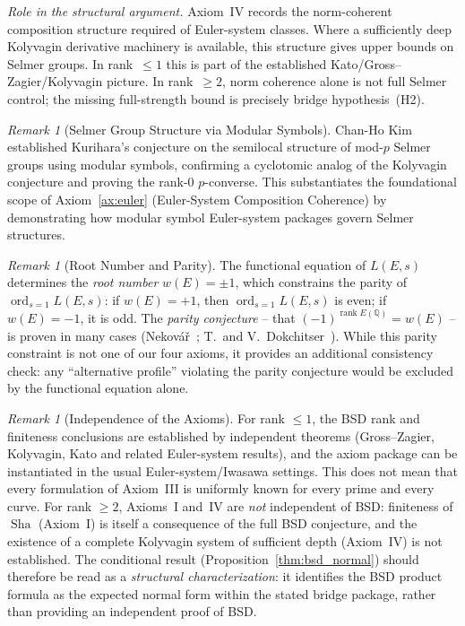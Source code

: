 \documentclass[aps,prd,twocolumn,superscriptaddress,nofootinbib,floatfix]{revtex4-2}
\theoremstyle{definition}
\theoremstyle{remark}
\newtheorem{remark}[theorem]{Remark}
\DeclareMathOperator{\ord}{ord}
\DeclareMathOperator{\rank}{rank}
\DeclareMathOperator{\Sha}{Sha}
\begin{document}
\textit{Role in the structural argument.} Axiom~IV records the norm-coherent composition structure required of Euler-system classes. Where a sufficiently deep Kolyvagin derivative machinery is available, this structure gives upper bounds on Selmer groups. In rank~$\leq 1$ this is part of the established Kato/Gross--Zagier/Kolyvagin picture. In rank~$\geq 2$, norm coherence alone is not full Selmer control; the missing full-strength bound is precisely bridge hypothesis~(H2).

\begin{remark}[Selmer Group Structure via Modular Symbols]
\label{rem:kim-kolyvagin}
Chan-Ho Kim~\cite{Kim2025} established Kurihara's conjecture on the semilocal structure of mod-$p$ Selmer groups using modular symbols, confirming a cyclotomic analog of the Kolyvagin conjecture and proving the rank-0 $p$-converse. This substantiates the foundational scope of Axiom~\ref{ax:euler} (Euler-System Composition Coherence) by demonstrating how modular symbol Euler-system packages govern Selmer structures.
\end{remark}

\begin{remark}[Root Number and Parity]
\label{rem:root_number}
The functional equation of $L(E,s)$ determines the \textit{root number} $w(E) = \pm 1$, which constrains the parity of $\ord_{s=1} L(E,s)$: if $w(E) = +1$, then $\ord_{s=1} L(E,s)$ is even; if $w(E) = -1$, it is odd. The \textit{parity conjecture} -- that $(-1)^{\rank E(\mathbb{Q})} = w(E)$ -- is proven in many cases (Nekovář~\cite{Nekovar2006}; T.~and V.~Dokchitser~\cite{Dokchitser2010}). While this parity constraint is not one of our four axioms, it provides an additional consistency check: any ``alternative profile'' violating the parity conjecture would be excluded by the functional equation alone.
\end{remark}

\begin{remark}[Independence of the Axioms]
\label{rem:axiom-independence}
For rank $\leq 1$, the BSD rank and finiteness conclusions are established by independent theorems (Gross--Zagier, Kolyvagin, Kato and related Euler-system results), and the axiom package can be instantiated in the usual Euler-system/Iwasawa settings. This does not mean that every formulation of Axiom~III is uniformly known for every prime and every curve. For rank $\geq 2$, Axioms~I and~IV are \textit{not} independent of BSD: finiteness of $\Sha$ (Axiom~I) is itself a consequence of the full BSD conjecture, and the existence of a complete Kolyvagin system of sufficient depth (Axiom~IV) is not established. The conditional result (Proposition~\ref{thm:bsd_normal}) should therefore be read as a \textit{structural characterization}: it identifies the BSD product formula as the expected normal form within the stated bridge package, rather than providing an independent proof of BSD.
\end{remark}
\end{document}
